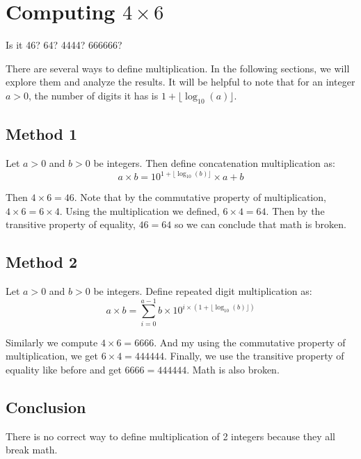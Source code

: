 \documentclass{article}[12pt]
\begin{document}
\section{Computing $4 \times 6$}

Is it 46? 64? 4444? 666666?

There are several ways to define multiplication. In the following sections, we
will explore them and analyze the results. It will be helpful to note that for
an integer $a>0$, the number of digits it has is $1+\lfloor\log_{10}(a)\rfloor$.

\subsection{Method 1}

Let $a>0$ and $b>0$ be integers. Then define concatenation multiplication as:
$$ a \times b = 10^{1 + \lfloor \log_{10}(b) \rfloor} \times a + b $$

Then $4 \times 6 = 46$. Note that by the commutative property of multiplication,
$4 \times 6 = 6 \times 4$. Using the multiplication we defined, $6 \times 4 =
64$. Then by the transitive property of equality, $46 = 64$ so we can conclude
that math is broken.

\subsection{Method 2}

Let $a>0$ and $b>0$ be integers. Define repeated digit multiplication as:
$$ a \times b = \sum_{i=0}^{a-1} b \times 10^{i\times(1+\lfloor\log_{10}(b)\rfloor)} $$

Similarly we compute $4 \times 6 = 6666$. And my using the commutative property
of multiplication, we get $6 \times 4 = 444444$. Finally, we use the transitive
property of equality like before and get $6666=444444$. Math is also broken.

\subsection{Conclusion}

There is no correct way to define multiplication of 2 integers because they all
break math.
\end{document}
